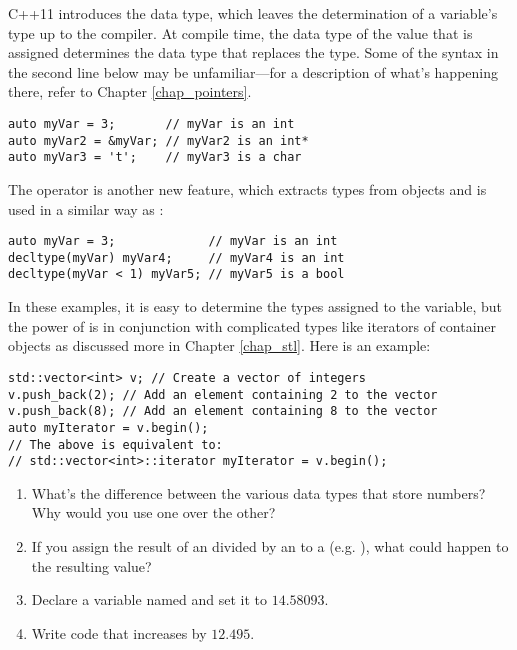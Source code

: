 
C++11 introduces the  data type, which leaves the determination of a variable's type up to the compiler. 
At compile time, the data type of the value that is assigned determines the data type that replaces the  type. Some of the syntax in the second line below may be unfamiliar---for a description of what's happening there, refer to Chapter \ref{chap_pointers}.

\noindent\begin{minipage}{\linewidth}\begin{lstlisting}
auto myVar = 3;       // myVar is an int
auto myVar2 = &myVar; // myVar2 is an int*
auto myVar3 = 't';    // myVar3 is a char
\end{lstlisting}\end{minipage}

The  operator is another new feature, which extracts types from objects and is used in a similar way as :

\noindent\begin{minipage}{\linewidth}\begin{lstlisting}
auto myVar = 3;             // myVar is an int
decltype(myVar) myVar4;     // myVar4 is an int
decltype(myVar < 1) myVar5; // myVar5 is a bool
\end{lstlisting}\end{minipage}

In these examples, it is easy to determine the types assigned to the variable, but the power of  is in conjunction with complicated types like iterators of container objects as discussed more in Chapter \ref{chap_stl}. Here is an example:

\noindent\begin{minipage}{\linewidth}\begin{lstlisting}
std::vector<int> v; // Create a vector of integers
v.push_back(2); // Add an element containing 2 to the vector
v.push_back(8); // Add an element containing 8 to the vector
auto myIterator = v.begin();
// The above is equivalent to:
// std::vector<int>::iterator myIterator = v.begin();
\end{lstlisting}\end{minipage}


\begin{enumerate}
	\item What's the difference between the various data types that store numbers? Why would you use one over the other?

	\item If you assign the result of an  divided by an  to a  (e.g. ), what could happen to the resulting value?

  \item Declare a variable named  and set it to $14.58093$.

 	\item Write code that increases  by $12.495$. 

\end{enumerate}


